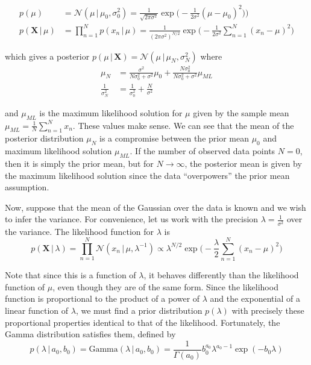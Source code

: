   \begin{align*}
    p(\mu) & = \mathcal{N}(\mu\,|\,\mu_0, \sigma_0^2) = \frac{1}{\sqrt{2 \pi \sigma^2}} \exp\bigg(-\frac{1}{2\sigma^2} (\mu - \mu_0)^2) \bigg) \\
    p(\mathbf{X}\,|\,\mu) & = \prod_{n=1}^N p(x_n\,|\,\mu) = \frac{1}{(2 \pi \sigma^2)^{N/2}} \exp\bigg(-\frac{1}{2 \sigma^2} \sum_{n=1}^N (x_n - \mu)^2 \bigg)
  \end{align*}

  which gives a posterior $p(\mu\,|\,\mathbf{X}) = \mathcal{N}(\mu \,|\, \mu_N, \sigma_N^2)$ where
  \begin{align*}
    \mu_N & = \frac{\sigma^2}{N \sigma_0^2 + \sigma^2} \mu_0 + \frac{N \sigma_0^2}{N \sigma_0^2 + \sigma^2} \mu_{ML} \\
    \frac{1}{\sigma_N^2} & = \frac{1}{\sigma_0^2} + \frac{N}{\sigma^2}
  \end{align*}

  and $\mu_{ML}$ is the maximum likelihood solution for $\mu$ given by the sample mean $\mu_{ML} = \frac{1}{N} \sum_{n=1}^N x_n$. These values make sense. We can see that the mean of the posterior distribution $\mu_N$ is a compromise between the prior mean $\mu_0$ and maximum likelihood solution $\mu_{ML}$. If the number of observed data points $N=0$, then it is simply the prior mean, but for $N \rightarrow \infty$, the posterior mean is given by the maximum likelihood solution since the data ``overpowers'' the prior mean assumption.

  Now, suppose that the mean of the Gaussian over the data is known and we wish to infer the variance. For convenience, let us work with the precision $\lambda = \frac{1}{\sigma^2}$ over the variance. The likelihood function for $\lambda$ is
  \begin{equation}
    p(\mathbf{X}\,|\,\lambda) = \prod_{n=1}^N \mathcal{N} (x_n\,|\, \mu, \lambda^{-1}) \propto \lambda^{N/2} \exp \bigg(-\frac{\lambda}{2} \sum_{n=1}^N (x_n - \mu)^2 \bigg)
  \end{equation}

  Note that since this is a function of $\lambda$, it behaves differently than the likelihood function of $\mu$, even though they are of the same form. Since the likelihood function is proportional to the product of a power of $\lambda$ and the exponential of a linear function of $\lambda$, we must find a prior distribution $p(\lambda)$ with precisely these proportional properties identical to that of the likelihood. Fortunately, the Gamma distribution satisfies them, defined by
  \begin{equation}
    p(\lambda\,|\,a_0, b_0) = \text{Gamma}(\lambda\,|\, a_0, b_0) = \frac{1}{\Gamma(a_0)} b_0^{a_0} \lambda^{a_0-1} \exp(-b_0 \lambda)
  \end{equation}

